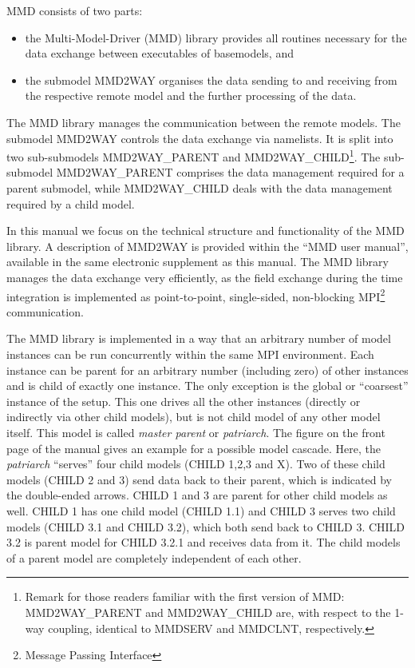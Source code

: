 \documentclass[twoside]{article}
\begin{document}
 MMD consists of two parts:
\begin{itemize}
\item the Multi-Model-Driver (MMD) library provides all routines necessary for 
the data exchange between executables of basemodels, and
\item the submodel MMD2WAY organises the data sending to and receiving 
from the respective remote model and the further processing of the data.
\end{itemize}
The MMD library manages the communication between the remote models.
The submodel MMD2WAY controls the data exchange via namelists. It is
split into two sub-submodels MMD2WAY\_PARENT and
MMD2WAY\_CHILD\footnote{Remark for those readers familiar with the first
version of MMD: MMD2WAY\_PARENT and  MMD2WAY\_CHILD are, with respect
to the 1-way coupling, identical to MMDSERV and MMDCLNT, respectively.}.
The sub-submodel MMD2WAY\_PARENT comprises the data management
required for a parent submodel, while MMD2WAY\_CHILD deals with the
data management required by a child model.

In this manual we focus on the technical structure and functionality of the MMD 
library. A description of MMD2WAY is provided within the 
``MMD user manual'', available in the same electronic supplement as this manual.
 The MMD library manages the data exchange very efficiently, as the field 
exchange during the time integration is implemented as point-to-point, 
single-sided, non-blocking MPI\footnote{Message Passing Interface} communication.

The MMD library is implemented in a way that an arbitrary number of
model instances can be run concurrently within the same MPI environment. 
Each instance can be parent for an arbitrary number (including zero) of other
instances and is child of exactly one instance. The only exception is the
 global or ``coarsest'' instance of the setup. This one drives all the
 other instances 
(directly or indirectly via other child models), but is not child model of
any other model itself. This model is called {\it master parent} or
{\it patriarch}. 
The figure on the front page of the manual gives an example for a possible
 model cascade.
Here, the {\it patriarch} ``serves'' four child models (CHILD 1,2,3
and X). Two of these child models (CHILD 2 and 3) send data back to their
parent, which is indicated by the double-ended arrows.
CHILD 1 and 3 are parent for other child models as well. CHILD 1 has one child 
model (CHILD 1.1) and CHILD 3 serves two child models (CHILD 3.1 and CHILD
3.2), which both send
back to CHILD 3. CHILD 3.2 is  parent model for CHILD 3.2.1
and receives data from it.
The child models of a parent model are completely independent of each other. 
\end{document}

